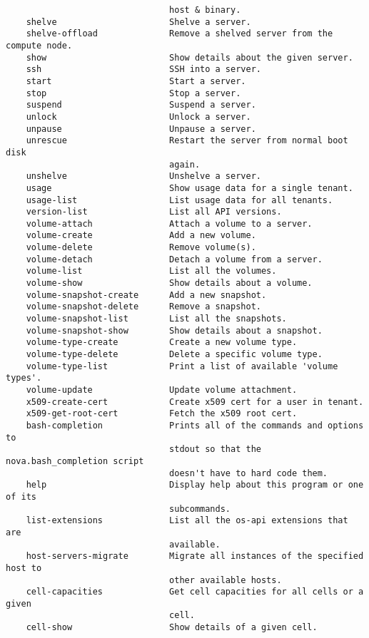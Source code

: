 \documentclass[a4paper,left=1.5cm,right=1.5cm,11pt]{article}
\begin{document}
\begin{lstlisting}
                                host & binary.
    shelve                      Shelve a server.
    shelve-offload              Remove a shelved server from the compute node.
    show                        Show details about the given server.
    ssh                         SSH into a server.
    start                       Start a server.
    stop                        Stop a server.
    suspend                     Suspend a server.
    unlock                      Unlock a server.
    unpause                     Unpause a server.
    unrescue                    Restart the server from normal boot disk
                                again.
    unshelve                    Unshelve a server.
    usage                       Show usage data for a single tenant.
    usage-list                  List usage data for all tenants.
    version-list                List all API versions.
    volume-attach               Attach a volume to a server.
    volume-create               Add a new volume.
    volume-delete               Remove volume(s).
    volume-detach               Detach a volume from a server.
    volume-list                 List all the volumes.
    volume-show                 Show details about a volume.
    volume-snapshot-create      Add a new snapshot.
    volume-snapshot-delete      Remove a snapshot.
    volume-snapshot-list        List all the snapshots.
    volume-snapshot-show        Show details about a snapshot.
    volume-type-create          Create a new volume type.
    volume-type-delete          Delete a specific volume type.
    volume-type-list            Print a list of available 'volume types'.
    volume-update               Update volume attachment.
    x509-create-cert            Create x509 cert for a user in tenant.
    x509-get-root-cert          Fetch the x509 root cert.
    bash-completion             Prints all of the commands and options to
                                stdout so that the nova.bash_completion script
                                doesn't have to hard code them.
    help                        Display help about this program or one of its
                                subcommands.
    list-extensions             List all the os-api extensions that are
                                available.
    host-servers-migrate        Migrate all instances of the specified host to
                                other available hosts.
    cell-capacities             Get cell capacities for all cells or a given
                                cell.
    cell-show                   Show details of a given cell.

\end{lstlisting}
\end{document}
